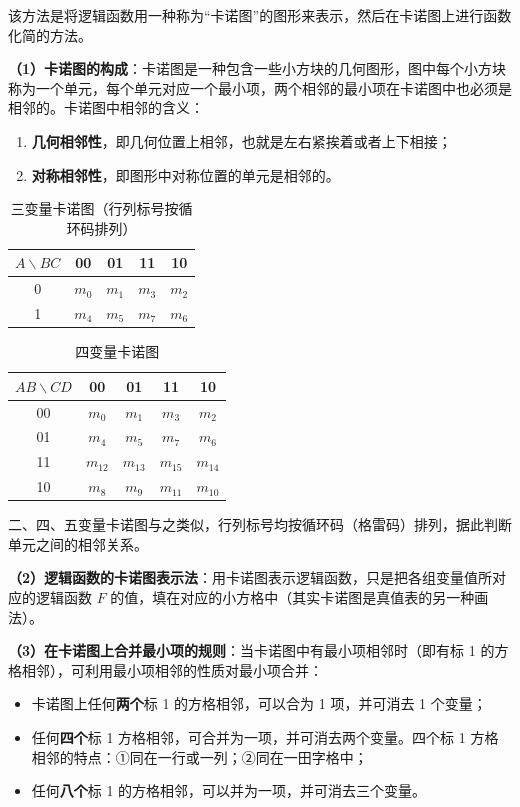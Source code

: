 该方法是将逻辑函数用一种称为“卡诺图”的图形来表示，然后在卡诺图上进行函数化简的方法。

\textbf{（1）卡诺图的构成}：卡诺图是一种包含一些小方块的几何图形，图中每个小方块称为一个单元，每个单元对应一个最小项，两个相邻的最小项在卡诺图中也必须是相邻的。卡诺图中相邻的含义：
\begin{enumerate}
	\item \textbf{几何相邻性}，即几何位置上相邻，也就是左右紧挨着或者上下相接；
	\item \textbf{对称相邻性}，即图形中对称位置的单元是相邻的。
\end{enumerate}

\begin{table}[H]
\centering
\caption{三变量卡诺图（行列标号按循环码排列）}
\label{tab:卡诺图:三变量}
\begin{tabular}{c|cccc}
	\toprule
	$A\backslash BC$ & 00 & 01 & 11 & 10 \\
	\midrule
	0 & $m_0$ & $m_1$ & $m_3$ & $m_2$ \\
	1 & $m_4$ & $m_5$ & $m_7$ & $m_6$ \\
	\bottomrule
\end{tabular}
\end{table}

\begin{table}[H]
\centering
\caption{四变量卡诺图}
\label{tab:卡诺图:四变量}
\begin{tabular}{c|cccc}
	\toprule
	$AB\backslash CD$ & 00 & 01 & 11 & 10 \\
	\midrule
	00 & $m_0$ & $m_1$ & $m_3$ & $m_2$ \\
	01 & $m_4$ & $m_5$ & $m_7$ & $m_6$ \\
	11 & $m_{12}$ & $m_{13}$ & $m_{15}$ & $m_{14}$ \\
	10 & $m_8$ & $m_9$ & $m_{11}$ & $m_{10}$ \\
	\bottomrule
\end{tabular}
\end{table}

二、四、五变量卡诺图与之类似，行列标号均按循环码（格雷码）排列，据此判断单元之间的相邻关系。

\textbf{（2）逻辑函数的卡诺图表示法}：用卡诺图表示逻辑函数，只是把各组变量值所对应的逻辑函数 $F$ 的值，填在对应的小方格中（其实卡诺图是真值表的另一种画法）。

\textbf{（3）在卡诺图上合并最小项的规则}：当卡诺图中有最小项相邻时（即有标 1 的方格相邻），可利用最小项相邻的性质对最小项合并：
\begin{itemize}
	\item 卡诺图上任何\textbf{两个}标 1 的方格相邻，可以合为 1 项，并可消去 1 个变量；
	\item 任何\textbf{四个}标 1 方格相邻，可合并为一项，并可消去两个变量。四个标 1 方格相邻的特点：①同在一行或一列；②同在一田字格中；
	\item 任何\textbf{八个}标 1 的方格相邻，可以并为一项，并可消去三个变量。
\end{itemize}

